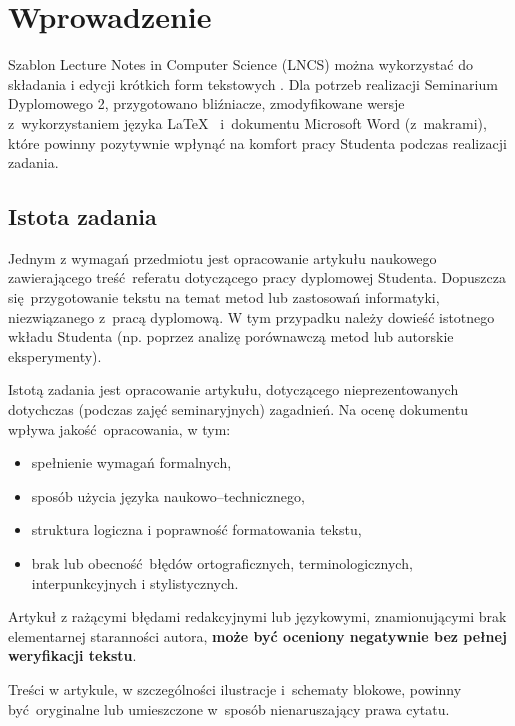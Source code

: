 \section{Wprowadzenie}
\label{sec:intro}

Szablon Lecture Notes in Computer Science (LNCS) można wykorzystać do składania i edycji krótkich form tekstowych \cite{ref:lncs}. Dla potrzeb realizacji Seminarium Dyplomowego 2, przygotowano bliźniacze, zmodyfikowane wersje z~wykorzystaniem języka \LaTeX~\cite{ref:latex} i~dokumentu Microsoft Word (z~makrami), które powinny pozytywnie wpłynąć na komfort pracy Studenta podczas realizacji zadania.

\subsection{Istota zadania}
\label{subsec:essence}

Jednym z wymagań przedmiotu jest opracowanie artykułu naukowego zawierającego treść referatu dotyczącego pracy dyplomowej Studenta. Dopuszcza się przygotowanie tekstu na temat metod lub zastosowań informatyki, niezwiązanego z~pracą dyplomową. W tym przypadku należy dowieść istotnego wkładu Studenta (np. poprzez analizę porównawczą metod lub autorskie eksperymenty).

Istotą zadania jest opracowanie artykułu, dotyczącego nieprezentowanych dotychczas (podczas zajęć seminaryjnych) zagadnień. Na ocenę dokumentu wpływa jakość opracowania, w tym:

\begin{itemize}[noitemsep]
	\item spełnienie wymagań formalnych,
	\item sposób użycia języka naukowo--technicznego,
	\item struktura logiczna i poprawność formatowania tekstu,
	\item brak lub obecność błędów ortograficznych, terminologicznych, interpunkcyjnych i stylistycznych.
\end{itemize}

\begin{note}
	Artykuł z rażącymi błędami redakcyjnymi lub językowymi, znamionującymi brak elementarnej staranności autora, \textbf{może być oceniony negatywnie bez pełnej weryfikacji tekstu}.
\end{note}

\begin{note}
	Treści w artykule, w szczególności ilustracje i~schematy blokowe, powinny być oryginalne lub umieszczone w~sposób nienaruszający prawa cytatu.
\end{note}

